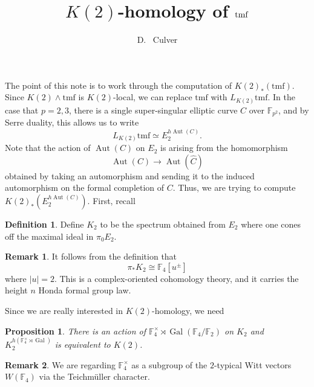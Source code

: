\documentclass[12pt]{amsart}
\title{$K(2)$-homology of $\tmf$}
\author{D.~ Culver}\address{University of Illinois, Urbana-Champaign}\email{dculver@illinois.edu}
\newcommand{\F}{\mathbb{F}}
\newcommand{\tmf}{\mathrm{tmf}}
\DeclareMathOperator{\Aut}{Aut}
\DeclareMathOperator{\Gal}{Gal}
\newtheorem{prop}{Proposition}
\theoremstyle{definition}
\newtheorem{defn}{Definition}
\newtheorem{rmk}{Remark}
\numberwithin{equation}{section}
\numberwithin{figure}{section}
\begin{document}
\maketitle

The point of this note is to work through the computation of $K(2)_*(\tmf)$. Since $K(2)\wedge \tmf$ is $K(2)$-local, we can replace $\tmf$ with $L_{K(2)}\tmf$. In the case that $p=2, 3$, there is a single super-singular elliptic curve $C$ over $\F_{p^2}$, and by Serre duality, this allows us to write 
\[
L_{K(2)}\tmf \simeq E_2^{h\Aut(C)}.
\]
Note that the action of $\Aut(C)$ on $E_2$ is arising from the homomorphism
\[
\Aut(C)\to \Aut(\widehat{C})
\]
obtained by taking an automorphism and sending it to the induced automorphism on the formal completion of $C$. Thus, we are trying to compute $K(2)_*(E_2^{h\Aut(C)})$. First, recall 

\begin{defn}
	Define $K_2$ to be the spectrum obtained from $E_2$ where one cones off the maximal ideal  in $\pi_0E_2$.
\end{defn}

\begin{rmk}
	It follows from the definition that 
	\[
	\pi_*K_2\cong \F_4[u^{\pm}]
	\]
	where $|u|=2$. This is a complex-oriented cohomology theory, and it carries the height $n$ Honda formal group law. 
\end{rmk}

Since we are really interested in $K(2)$-homology, we need 

\begin{prop}
	There is an action of $\F_4^\times\rtimes \Gal(\F_4/\F_2)$ on $K_2$ and $K_2^{h(\F_4^\times\rtimes \Gal)}$ is equivalent to $K(2)$.
\end{prop}

\begin{rmk}
We are regarding $\F_4^\times$ as a subgroup of the $2$-typical Witt vectors $W(\F_4)$ via the Teichm\"uller character.	
\end{rmk}
\end{document}
